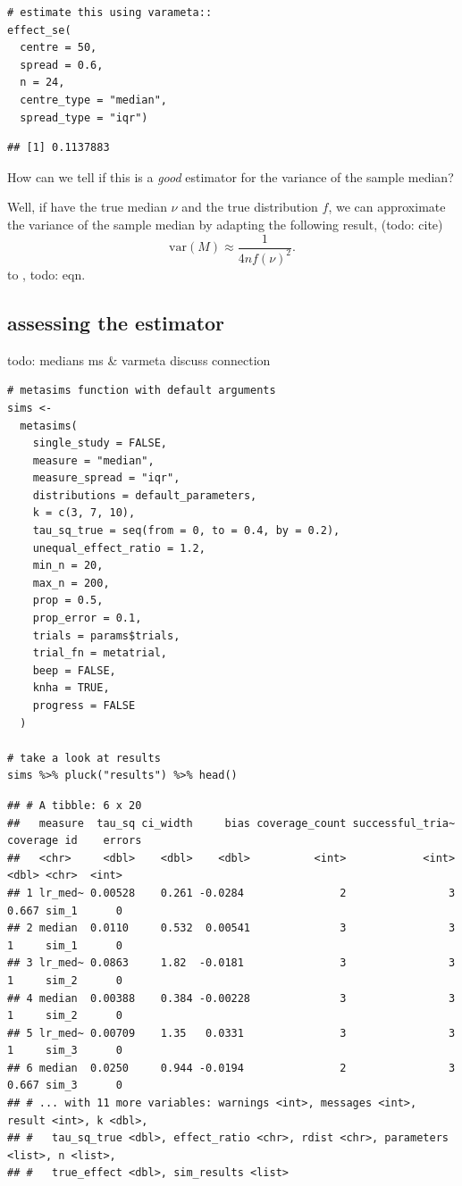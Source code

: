 \documentclass[
]{article}
\begin{document}
\begin{verbatim}
# estimate this using varameta::
effect_se(
  centre = 50, 
  spread = 0.6, 
  n = 24, 
  centre_type = "median",
  spread_type = "iqr") 
\end{verbatim}

\begin{verbatim}
## [1] 0.1137883
\end{verbatim}

How can we tell if this is a \emph{good} estimator for the variance of
the sample median?

Well, if have the true median \(\nu\) and the true distribution \(f\),
we can approximate the variance of the sample median by adapting the
following result, (todo: cite) \[
\textrm{var}(M) \approx \frac 1 {4nf(\nu)^2}.
\] to , todo: eqn.

\hypertarget{assessing-the-estimator}{%
\subsection{assessing the estimator}\label{assessing-the-estimator}}

todo: medians ms \& varmeta discuss connection

\begin{verbatim}
# metasims function with default arguments
sims <-
  metasims(
    single_study = FALSE,
    measure = "median",
    measure_spread = "iqr",
    distributions = default_parameters,
    k = c(3, 7, 10),
    tau_sq_true = seq(from = 0, to = 0.4, by = 0.2),
    unequal_effect_ratio = 1.2,
    min_n = 20,
    max_n = 200,
    prop = 0.5,
    prop_error = 0.1,
    trials = params$trials,
    trial_fn = metatrial,
    beep = FALSE,
    knha = TRUE,
    progress = FALSE
  ) 

# take a look at results
sims %>% pluck("results") %>% head()
\end{verbatim}

\begin{verbatim}
## # A tibble: 6 x 20
##   measure  tau_sq ci_width     bias coverage_count successful_tria~ coverage id    errors
##   <chr>     <dbl>    <dbl>    <dbl>          <int>            <int>    <dbl> <chr>  <int>
## 1 lr_med~ 0.00528    0.261 -0.0284               2                3    0.667 sim_1      0
## 2 median  0.0110     0.532  0.00541              3                3    1     sim_1      0
## 3 lr_med~ 0.0863     1.82  -0.0181               3                3    1     sim_2      0
## 4 median  0.00388    0.384 -0.00228              3                3    1     sim_2      0
## 5 lr_med~ 0.00709    1.35   0.0331               3                3    1     sim_3      0
## 6 median  0.0250     0.944 -0.0194               2                3    0.667 sim_3      0
## # ... with 11 more variables: warnings <int>, messages <int>, result <int>, k <dbl>,
## #   tau_sq_true <dbl>, effect_ratio <chr>, rdist <chr>, parameters <list>, n <list>,
## #   true_effect <dbl>, sim_results <list>
\end{verbatim}
\end{document}
